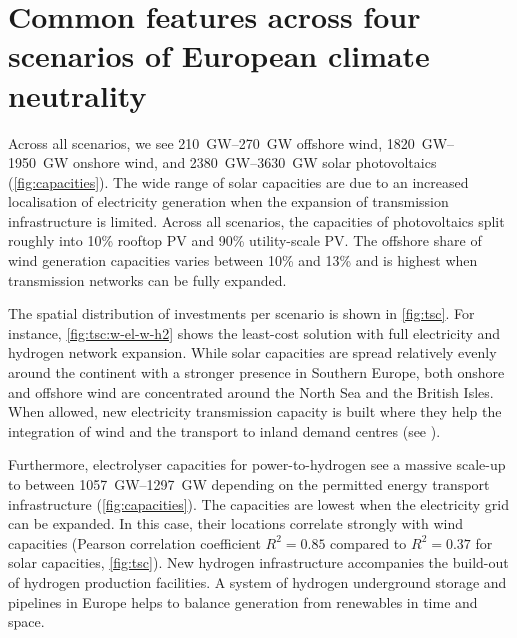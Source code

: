 \section*{Common features across four scenarios of European climate neutrality}
\label{sec:es}

Across all scenarios, we see \SIrange{210}{270}{\giga\watt} offshore wind,
\SIrange{1820}{1950}{\giga\watt} onshore wind, and
\SIrange{2380}{3630}{\giga\watt} solar photovoltaics (\cref{fig:capacities}).
The wide range of solar capacities are due to an increased localisation of
electricity generation when the expansion of transmission infrastructure is
limited. Across all scenarios, the capacities of photovoltaics split roughly
into 10\% rooftop PV and 90\% utility-scale PV. The offshore share of wind
generation capacities varies between 10\% and 13\% and is highest when
transmission networks can be fully expanded.

The spatial distribution of investments per scenario is shown in \cref{fig:tsc}.
For instance, \cref{fig:tsc:w-el-w-h2} shows the least-cost solution with
full electricity and hydrogen network expansion. While solar capacities are
spread relatively evenly around the continent with a stronger presence in
Southern Europe, both onshore and offshore wind are concentrated around the
North Sea and the British Isles. When allowed, new electricity transmission
capacity is built where they help the integration of wind and the transport to
inland demand centres (see ).

Furthermore, electrolyser capacities for power-to-hydrogen see a massive
scale-up to between \SIrange{1057}{1297}{\giga\watt} depending on the permitted
energy transport infrastructure (\cref{fig:capacities}). The capacities are
lowest when the electricity grid can be expanded. In this case, their locations
correlate strongly with wind capacities (Pearson correlation coefficient
$R^2=0.85$ compared to $R^2=0.37$ for solar capacities, \cref{fig:tsc}). New
hydrogen infrastructure accompanies the build-out of hydrogen production
facilities. A system of hydrogen underground storage and pipelines in Europe
helps to balance generation from renewables in time and space.

